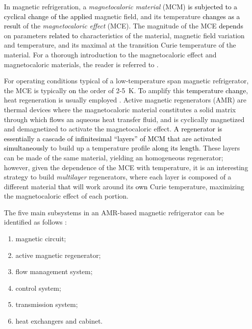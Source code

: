 \documentclass[referee]{svjour3}
\begin{document}

In magnetic refrigeration, a \emph{magnetocaloric material} (MCM) \textcolor{black}{is subjected to a cyclical change of the applied} magnetic field, and its temperature \textcolor{black}{changes as a result} of the \emph{magnetocaloric effect} (MCE). The magnitude of the MCE  \textcolor{black}{depends} on  parameters \textcolor{black}{related to} characteristics of the material, magnetic field variation and temperature, and its maximal at the transition Curie temperature of the material. For a thorough introduction to the magnetocaloric effect and magnetocaloric materials, the reader is referred to \cite{bib:smith-magneto}.


For operating conditions typical of a low-temperature span magnetic refrigerator, the MCE is typically \textcolor{black}{on} the order of \num{2}-\SI{5}{\kelvin}. \textcolor{black}{T}o amplify this \textcolor{black}{temperature change}, heat regeneration is usually employed \cite{bib:kitanovski}. Active magnetic regenerators (AMR) are thermal devices where the magnetocaloric material constitutes a solid matrix through which flows an aqueous heat transfer fluid, and is cyclically magnetized and demagnetized to activate the magnetocaloric effect.  \textcolor{black}{A regenerator is essentially a cascade of infinitesimal ``layers'' of MCM that are activated simultaneously} to build up a temperature profile \textcolor{black}{along its length}. These layers can be made of the same material, yielding an homogeneous regenerator; however, given the  dependence  of the MCE with temperature, it is an interesting strategy to build \emph{multilayer} regenerators, where each layer is composed of a different material \textcolor{black}{that} will work around its \textcolor{black}{own} Curie temperature, maximizing the magnetocaloric effect of each portion.


The five main subsystems in an AMR-based magnetic refrigerator can be identified as follows \cite{bib:jaime,bib:trevizoli16_pump}:

\begin{enumerate}
\item magnetic circuit; \label{item:1}
\item active magnetic regenerator; \label{item:2}
\item flow management system; \label{item:3}
\item control system; \label{item:4}
\item transmission system; \label{item:5}
\item heat exchangers and cabinet. \label{item:6a}
\end{enumerate}
\end{document}
